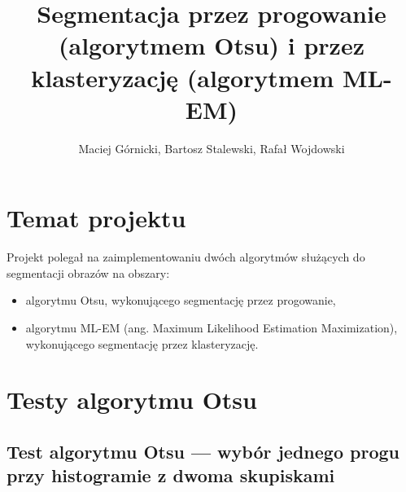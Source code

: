 \documentclass[10pt]{llncs}
\begin{document}
	
\title{Segmentacja przez progowanie (algorytmem Otsu) i przez klasteryzację (algorytmem ML-EM)}
\author{Maciej Górnicki, Bartosz Stalewski, Rafał Wojdowski}
\maketitle

\section{Temat projektu}

Projekt polegał na zaimplementowaniu dwóch algorytmów służących do segmentacji obrazów na obszary:
\begin{itemize}
	\item algorytmu Otsu, wykonującego segmentację przez progowanie,
	\item algorytmu ML-EM (ang. Maximum Likelihood Estimation Maximization), wykonującego segmentację przez klasteryzację. 
\end{itemize}

\section{Testy algorytmu Otsu}

\subsection{Test algorytmu Otsu --- wybór jednego progu przy histogramie z dwoma skupiskami}
\end{document}
